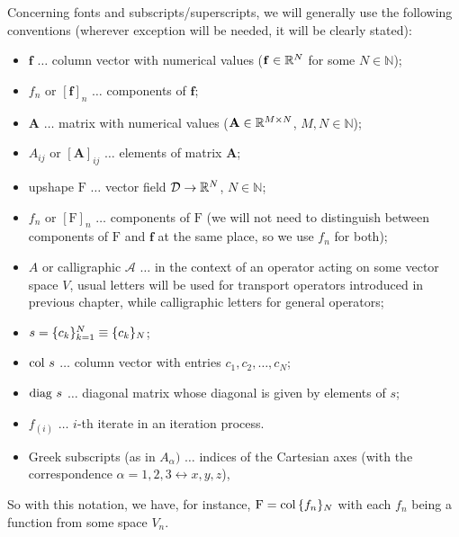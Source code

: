 Concerning fonts and subscripts/superscripts, we will generally use the following conventions (wherever exception will
be needed, it will be clearly stated):
\begin{itemize}
  \item $\mathbf{f}$ $\ldots$ column vector with numerical values ($\mathbf{f}\in\R[N]$ for some $N\in\mathbb{N}$);
  \item $f_n$ or $[\mathbf{f}]_n$ $\ldots$ components of $\mathbf{f}$;
  \item $\mathbf{A}$ $\ldots$ matrix with numerical values ($\mathbf{A}\in\R[M\times N]$, $M,N\in\mathbb{N}$);
  \item $A_{ij}$ or $[\mathbf{A}]_{ij}$ $\ldots$ elements of matrix $\mathbf{A}$;
  \item upshape $\mathrm{F}$ $\ldots$ vector field $\VV\to\R[N]$, $N\in\mathbb{N}$;
  \item $f_n$ or $[\mathrm{F}]_n$ $\ldots$ components of $\mathrm{F}$ (we will not need to distinguish between
  components of $\mathrm{F}$ and $\mathbf{f}$ at the same place, so we use $f_n$ for both);
  \item $A$ or calligraphic $\mathcal{A}$ $\ldots$ in the context of an operator acting on some vector space $V$, usual
  letters will be used for transport operators introduced in previous chapter, while calligraphic letters for general  
  operators;
  \item $s = \{c_k\}_{k=1}^N \equiv \{c_k\}_\idxset{N}$;
  \item $\col s$ $\ldots$ column vector with entries $c_1,c_2,\ldots,c_N$;
  \item $\diag s$ $\ldots$ diagonal matrix whose diagonal is given by elements of $s$;
  \item $f_{(i)}$ $\ldots$ $i$-th iterate in an iteration process.
  \item Greek subscripts (as in $A_{\alpha})$ $\ldots$ indices of the Cartesian axes (with the
    correspondence $\alpha = 1,2,3 \leftrightarrow x,y,z$),
\end{itemize}
So with this notation, we have, for instance, $\mathrm{F} = \col \{f_n\}_N$ with each $f_n$ being a function from some
space $V_n$.
\mbox{}\\

